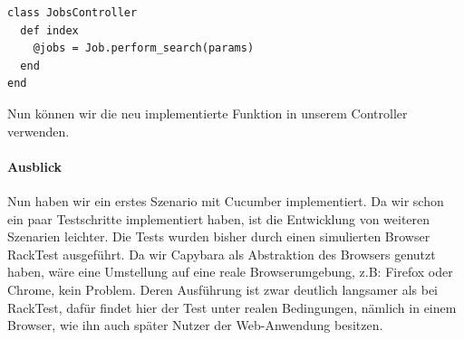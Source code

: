 \begin{lstlisting}
class JobsController
  def index
    @jobs = Job.perform_search(params)
  end
end
\end{lstlisting}
Nun können wir die neu implementierte Funktion in unserem Controller verwenden.

\paragraph{Ausblick}
Nun haben wir ein erstes Szenario mit Cucumber implementiert. Da wir schon ein paar Testschritte implementiert haben, ist die Entwicklung von weiteren Szenarien leichter. 
Die Tests wurden bisher durch einen simulierten Browser RackTest ausgeführt. Da wir Capybara als Abstraktion des Browsers genutzt haben, wäre eine Umstellung auf eine reale Browserumgebung, z.B: Firefox oder Chrome, kein Problem. Deren Ausführung ist zwar deutlich langsamer als bei RackTest, dafür findet hier der Test unter realen Bedingungen, nämlich in einem Browser, wie ihn auch später Nutzer der Web-Anwendung besitzen.
